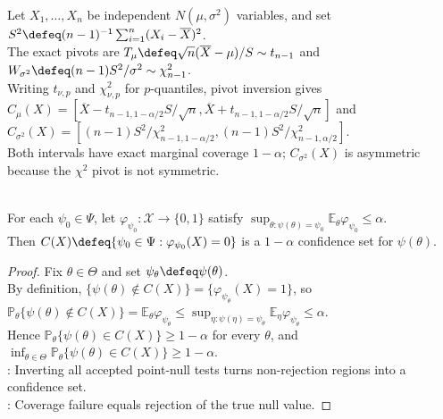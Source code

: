 \begin{example} \label{ex:normal-mean-variance-exact-confidence-intervals} \\
Let $X_1,\ldots,X_n$ be independent $N(\mu,\sigma^2)$ variables, and set $S^2\defeq(n-1)^{-1}\sum_{i=1}^n(X_i-\overline{X})^2$.\\
The exact pivots are $T_\mu\defeq\sqrt n(\overline{X}-\mu)/S\sim t_{n-1}$ and $W_{\sigma^2}\defeq(n-1)S^2/\sigma^2\sim\chi^2_{n-1}$.\\
Writing $t_{\nu,p}$ and $\chi^2_{\nu,p}$ for $p$-quantiles, pivot inversion gives $C_\mu(X)=[\overline{X}-t_{n-1,1-\alpha/2}S/\sqrt n,\overline{X}+t_{n-1,1-\alpha/2}S/\sqrt n]$ and $C_{\sigma^2}(X)=[(n-1)S^2/\chi^2_{n-1,1-\alpha/2},(n-1)S^2/\chi^2_{n-1,\alpha/2}]$.\\
Both intervals have exact marginal coverage $1-\alpha$; $C_{\sigma^2}(X)$ is asymmetric because the $\chi^2$ pivot is not symmetric.
\end{example}

\begin{proposition} \label{prop:test-confidence-duality} \\
For each $\psi_0\in\Psi$, let $\varphi_{\psi_0}:\mathcal{X}\to\{0,1\}$ satisfy $\sup_{\theta:\psi(\theta)=\psi_0}\mathbb{E}_\theta\varphi_{\psi_0}\leq\alpha$.\\
Then $C(X)\defeq\{\psi_0\in\Psi:\varphi_{\psi_0}(X)=0\}$ is a $1-\alpha$ confidence set for $\psi(\theta)$.
\begin{proof}
Fix $\theta\in\Theta$ and set $\psi_\theta\defeq\psi(\theta)$.\\
By definition, $\{\psi(\theta)\notin C(X)\}=\{\varphi_{\psi_\theta}(X)=1\}$, so $\mathbb{P}_\theta\{\psi(\theta)\notin C(X)\}=\mathbb{E}_\theta\varphi_{\psi_\theta}\leq\sup_{\eta:\psi(\eta)=\psi_\theta}\mathbb{E}_\eta\varphi_{\psi_\theta}\leq\alpha$.\\
Hence $\mathbb{P}_\theta\{\psi(\theta)\in C(X)\}\geq1-\alpha$ for every $\theta$, and $\inf_{\theta\in\Theta}\mathbb{P}_\theta\{\psi(\theta)\in C(X)\}\geq1-\alpha$.\\
: Inverting all accepted point-null tests turns non-rejection regions into a confidence set.\\
: Coverage failure equals rejection of the true null value.
\end{proof}
\end{proposition}

